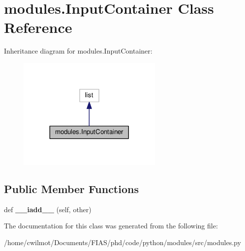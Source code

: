 \hypertarget{classmodules_1_1_input_container}{}\section{modules.\+Input\+Container Class Reference}
\label{classmodules_1_1_input_container}


Inheritance diagram for modules.\+Input\+Container\+:\nopagebreak
\begin{figure}[H]
\begin{center}
\leavevmode
\includegraphics[width=200pt]{classmodules_1_1_input_container__inherit__graph}
\end{center}
\end{figure}
\subsection*{Public Member Functions}
\begin{DoxyCompactItemize}
\item 
\mbox{\label{classmodules_1_1_input_container_af7bdc54b020a636c26ca754b7ae15533}} 
def {\bfseries \+\_\+\+\_\+iadd\+\_\+\+\_\+} (self, other)
\end{DoxyCompactItemize}


The documentation for this class was generated from the following file\+:\begin{DoxyCompactItemize}
\item 
/home/cwilmot/\+Documents/\+F\+I\+A\+S/phd/code/python/modules/src/modules.\+py\end{DoxyCompactItemize}

